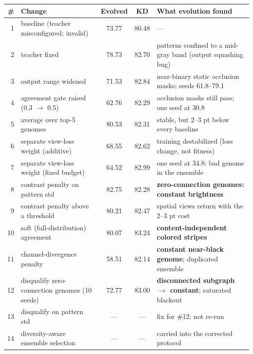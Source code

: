 \begin{tabular}{rp{4.4cm}ccp{6.2cm}}
\toprule
\# & Change & Evolved & KD & What evolution found \\
\midrule
1 & baseline (teacher misconfigured; invalid) & 73.77 & 80.48 & --- \\
2 & teacher fixed & 78.73 & 82.70 & patterns confined to a mid-gray band (output squashing bug) \\
3 & output range widened & 71.53 & 82.84 & near-binary static occlusion masks; seeds 61.8--79.1 \\
4 & agreement gate raised (0.3 $\rightarrow$ 0.5) & 62.76 & 82.29 & occlusion masks still pass; one seed at 30.8 \\
5 & average over top-5 genomes & 80.53 & 82.31 & stable, but 2--3 pt below every baseline \\
6 & separate view-loss weight (additive) & 68.55 & 82.62 & training destabilized (loss change, not fitness) \\
7 & separate view-loss weight (fixed budget) & 64.52 & 82.99 & one seed at 34.8: bad genome in the ensemble \\
8 & contrast penalty on pattern std & 82.75 & 82.28 & \textbf{zero-connection genomes: constant brightness} \\
9 & contrast penalty above a threshold & 80.21 & 82.47 & spatial views return with the 2--3 pt cost \\
10 & soft (full-distribution) agreement & 80.07 & 83.24 & \textbf{content-independent colored stripes} \\
11 & channel-divergence penalty & 58.51 & 82.14 & \textbf{constant near-black genome}; duplicated ensemble \\
12 & disqualify zero-connection genomes (10 seeds) & 72.77 & 83.00 & \textbf{disconnected subgraph $\rightarrow$ constant}; saturated blackout \\
13 & disqualify on pattern std & --- & --- & fix for \#12; not re-run \\
14 & diversity-aware ensemble selection & --- & --- & carried into the corrected protocol \\
\bottomrule
\end{tabular}
